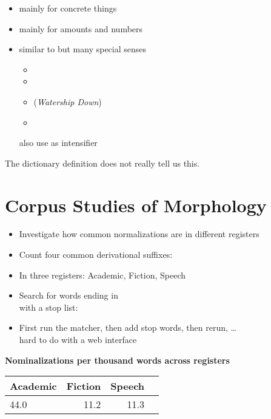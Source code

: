 \documentclass[a4paper,landscape,headrule,footrule,xetex]{foils}
\begin{document}

\begin{itemize}
\item {}  mainly for concrete things
\item {}  mainly for amounts and numbers
\item {} similar to  but many special senses
  \begin{itemize}
  \item {}  
  \item {}  
  \item {} (\textit{Watership Down})
  \item {} 
  \end{itemize}
also use as intensifier 
\end{itemize}

The dictionary definition does not really tell us this.

\section{Corpus Studies of Morphology}


\begin{itemize}
\item Investigate how common normalizations are in different registers
\item Count four common derivational suffixes:  
\item In three registers: Academic, Fiction, Speech
\item Search for words ending in 
\\ with a stop list: 
\item First run the matcher, then add stop words, then rerun, \ldots
\\ hard to do with a web interface
\end{itemize}

\noindent \textbf{Nominalizations per thousand words across registers}
\\ \begin{tabular}{lrrr}
 Academic & Fiction & Speech \\ \hline
 44.0   & 11.2    &  11.3   
\end{tabular}
\end{document}
